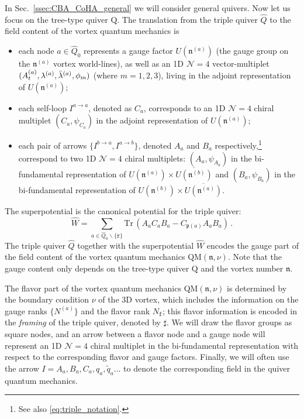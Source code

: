 \documentclass[12pt,a4paper]{article}
\newcommand{\nn}{\mathfrak{n}}
\renewcommand{\(}{\left(}
\renewcommand{\)}{\right)}
\renewcommand{\(}{\left(}
\renewcommand{\)}{\right)}
\begin{document}
In Sec.~\ref{ssec:CBA_CoHA_general}  we will consider general quivers. 
Now let us focus on the tree-type quiver $\mathrm{Q}$.
The translation from the triple quiver $\widehat{Q}$ to the field content of the vortex quantum mechanics is
\begin{itemize}
\item each node $a\in \widehat{Q}_0$ represents a gauge factor $U(\nn^{(a)})$ (the gauge group on the $\nn^{(a)}$ vortex world-lines), as well as an 1D $\mathcal{N}=4$ vector-multiplet $(A^{(a)}_t,\lambda^{(a)},\bar{\lambda}^{(a)},\\\phi_m)$ (where $m=1,2,3$), living in the adjoint representation of $U(\nn^{(a)})$;
\item each self-loop $I^{a\rightarrow a}$, denoted as $C_a$, corresponds to an 1D $\mathcal{N}=4$ chiral multiplet $(C_a,\psi_{C_a})$ in the adjoint representation of $U(\nn^{(a)})$;
\item each pair of arrows $\{I^{b\rightarrow a},I^{a\rightarrow b}\}$, denoted $A_a$ and $B_a$ respectively,\footnote{See also  \eqref{eq:triple_notation}.} correspond to two 1D $\mathcal{N}=4$ chiral multiplets: $(A_a,\psi_{A_a})$ in the bi-fundamental representation of $U(\nn^{(a)})\times\overline{U(\nn^{(b)})}$ and $(B_a,\psi_{B_a})$ in the bi-fundamental representation of $U(\nn^{(b)})\times\overline{U(\nn^{(a)})}$.
\end{itemize}
The superpotential is the canonical potential for the triple quiver:
\begin{equation}
\widehat{W}=\sum_{a\in \widehat{Q}_0\backslash \{\mathtt{r}\}}\mathrm{Tr}\,(A_aC_aB_a-C_{\mathfrak{p}(a)}A_aB_a)\,.
\end{equation} 
The triple quiver $\widehat{Q}$ together with the superpotential $\widehat{W}$ encodes the gauge part of the field content of the vortex quantum mechanics QM$(\nn,\nu)$. 
Note that the gauge content only depends on the tree-type quiver $\mathrm{Q}$ and the vortex number $\nn$.

\medskip
The flavor part of the vortex quantum mechanics QM$(\nn,\nu)$ is determined by the boundary condition $\nu$ of the 3D vortex, which includes the information on the gauge ranks $\{N^{(a)}\}$ and the flavor rank $N_{\mathtt{f}}$; this flavor information is encoded in the \textit{framing} of the triple quiver, denoted by $\sharp$. 
We will draw the flavor groups as square nodes, and an arrow between a flavor node and a gauge node will represent an 1D $\mathcal{N}=4$ chiral multiplet in the bi-fundamental representation with respect to the corresponding flavor and gauge factors.
Finally, we will often use the arrow $I=A_a,B_a,C_a,q_a,\tilde{q}_a\dots$ to denote the corresponding field in the quiver quantum mechanics. 
\end{document}
